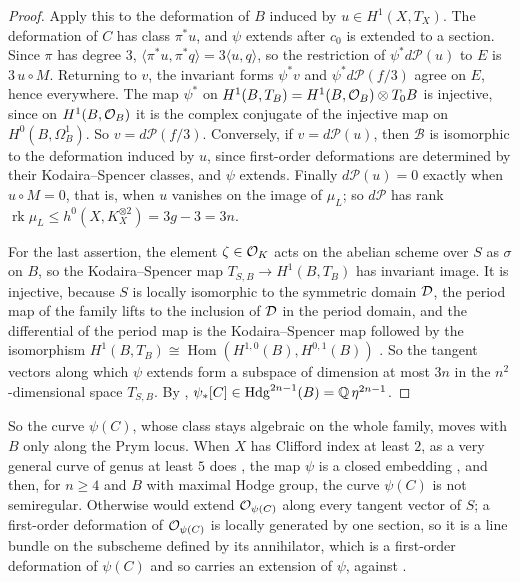 \begin{proof}
Apply this to the deformation of $B$ induced by $u\in H^{1}(X,T_{X})$. The
deformation of $C$ has class $\pi^{*}u$, and $\psi$ extends after $c_{0}$ is
extended to a section. Since $\pi$ has degree $3$, $\langle\pi^{*}u,
\pi^{*}q\rangle=3\langle u,q\rangle$, so the restriction of
$\psi^{*}d\mathcal{P}(u)$ to $E$ is $3\,u\circ M$. Returning to $v$, the
invariant forms $\psi^{*}v$ and $\psi^{*}d\mathcal{P}(f/3)$ agree on $E$,
hence everywhere. The map $\psi^{*}$ on $H^{1}(B,T_{B})=H^{1}(B,\mathcal{O}_{B})
\otimes T_{0}B$ is injective, since on $H^{1}(B,\mathcal{O}_{B})$ it is the complex
conjugate of the injective map on $H^{0}(B,\Omega^{1}_{B})$. So
$v=d\mathcal{P}(f/3)$. Conversely, if $v=d\mathcal{P}(u)$, then $\mathcal{B}$
is isomorphic to the deformation induced by $u$, since first-order
deformations are determined by their Kodaira--Spencer classes, and $\psi$
extends. Finally $d\mathcal{P}(u)=0$ exactly when $u\circ M=0$, that is, when
$u$ vanishes on the image of $\mu_{L}$; so $d\mathcal{P}$ has rank
$\operatorname{rk}\mu_{L}\le h^{0}(X,K_{X}^{\otimes2})=3g-3=3n$.

For the last assertion, the element $\zeta\in\mathcal{O}_{K}$ acts on the abelian
scheme over $S$ as $\sigma$ on $B$, so the Kodaira--Spencer map
$T_{S,B}\to H^{1}(B,T_{B})$ has invariant image. It is injective, because $S$
is locally isomorphic to the symmetric domain $\mathcal{D}$, the period map of the
family lifts to the inclusion of $\mathcal{D}$ in the period domain, and the
differential of the period map is the Kodaira--Spencer map followed by the
isomorphism $H^{1}(B,T_{B})\cong\operatorname{Hom}(H^{1,0}(B),
H^{0,1}(B))$ \cite[Chapter~10]{Voi02b}. So the tangent vectors along which
$\psi$ extends form a subspace of dimension at most $3n$ in the
$n^{2}$-dimensional space $T_{S,B}$. By ,
$\psi_{*}[C]\in\operatorname{Hdg}^{2n-1}(B)=\mathbb{Q}\,\eta^{2n-1}$.
\end{proof}

So the curve $\psi(C)$, whose class stays algebraic on the whole family,
moves with $B$ only along the Prym locus. When $X$ has Clifford index at
least $2$, as a very general curve of genus at least $5$ does
\cite[Chapter~V]{ACGH85}, the map $\psi$ is a closed embedding
\cite{LO11}, and then, for $n\ge4$ and $B$ with maximal Hodge group, the
curve $\psi(C)$ is not semiregular. Otherwise  would extend
$\mathcal{O}_{\psi(C)}$ along every tangent vector of $S$; a first-order deformation of $\mathcal{O}_{\psi(C)}$ is locally
generated by one section, so it is a line bundle on the subscheme defined by
its annihilator, which is a first-order deformation of $\psi(C)$ and so
carries an extension of $\psi$, against .

